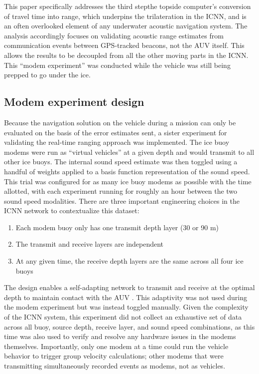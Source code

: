 This paper specifically addresses the third step\textemdash the topside computer's conversion of travel time into range, which underpins the trilateration in the ICNN, and is an often overlooked element of any underwater acoustic navigation system.
The analysis accordingly focuses on validating acoustic range estimates from communication events between GPS-tracked beacons, not the AUV itself.
This allows the results to be decoupled from all the other moving parts in the ICNN.
This ``modem experiment'' was conducted while the vehicle was still being prepped to go under the ice.

\subsection{Modem experiment design}

Because the navigation solution on the vehicle during a mission can only be evaluated on the basis of the error estimates sent, a sister experiment for validating the real-time ranging approach was implemented.
The ice buoy modems were run as ``virtual vehicles'' at a given depth and would transmit to all other ice buoys.
The internal sound speed estimate was then toggled using a handful of weights applied to a basis function representation of the sound speed.
This trial was configured for as many ice buoy modems as possible with the time allotted, with each experiment running for roughly an hour between the two sound speed modalities.
There are three important engineering choices in the ICNN network to contextualize this dataset:
\begin{enumerate}
\item Each modem buoy only has one transmit depth layer (30 or 90 m)
\item The transmit and receive layers are independent
\item At any given time, the receive depth layers are the same across all four ice buoys
\end{enumerate}

The design enables a self-adapting network to transmit and receive at the optimal depth to maintain contact with the AUV \citep{schneider_self-adapting_2020}.
This adaptivity was not used during the modem experiment but was instead toggled manually.
Given the complexity of the ICNN system, this experiment did not collect an exhaustive set of data across all buoy, source depth, receive layer, and sound speed combinations, as this time was also used to verify and resolve any hardware issues in the modems themselves.
Importantly, only one modem at a time could run the vehicle behavior to trigger group velocity calculations; other modems that were transmitting simultaneously recorded events as modems, not as vehicles.

